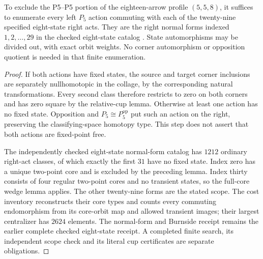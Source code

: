 \begin{proposition}
\label{CP2:A-P5-double-eight-scope}
To exclude the P5--P5 portion of the eighteen-arrow profile
$(5,5,8)$, it suffices to enumerate every left $P_5$ action
commuting with each of the twenty-nine specified eight-state
right acts. They are the right normal forms indexed
$1,2,\ldots,29$ in the checked eight-state catalog
.
State automorphisms may be divided out, with exact orbit
weights. No corner automorphism or opposition quotient is
needed in that finite enumeration.
\end{proposition}
\begin{proof}
If both actions have fixed states, the source and target
corner inclusions are separately nullhomotopic in the
collage, by the corresponding natural transformations.
Every second class therefore restricts to zero on both
corners and has zero square by the relative-cup lemma.
Otherwise at least one action has no fixed state.
Opposition and $P_5\cong P_5^{\mathrm{op}}$ put such an
action on the right, preserving the classifying-space
homotopy type. This step does not assert that both actions
are fixed-point free.

The independently checked eight-state normal-form catalog
has $1212$ ordinary right-act classes, of which exactly
the first $31$ have no fixed state. Index zero has a
unique two-point core and is excluded by the preceding
lemma. Index thirty consists of four regular two-point
cores and no transient states, so the full-core wedge
lemma applies. The other twenty-nine forms are the stated
scope. The cost inventory
reconstructs their core types and counts every commuting
endomorphism from its core-orbit map and allowed transient
images; their largest centralizer has $2624$ elements.
The normal-form and Burnside receipt remains the earlier
complete checked eight-state receipt. A completed finite
search, its independent scope check and its literal cup
certificates are separate obligations.
\end{proof}
